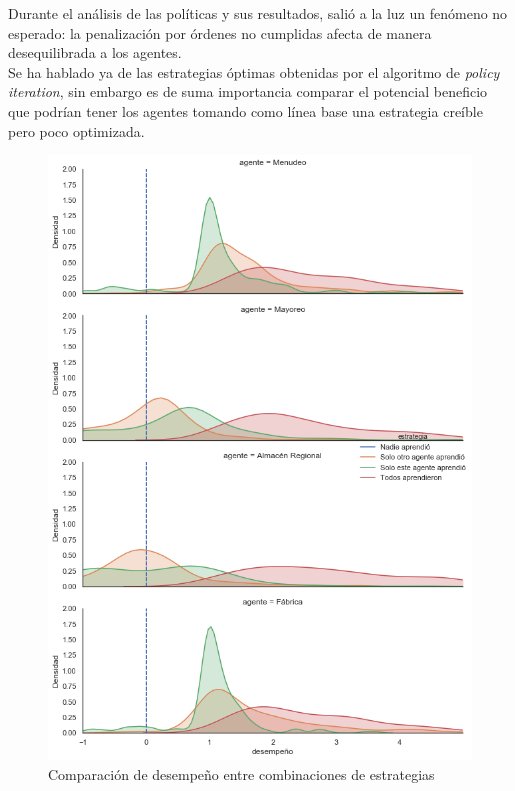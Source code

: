 Durante el an\'alisis de las pol\'iticas y sus resultados, sali\'o a la luz un fen\'omeno no esperado: la penalizaci\'on por \'ordenes no cumplidas afecta de manera desequilibrada a los agentes.\\

Se ha hablado ya de las estrategias \'optimas obtenidas por el algoritmo de \textit{policy iteration}, sin embargo es de suma importancia comparar el potencial beneficio que podr\'ian tener los agentes tomando como l\'inea base una estrategia cre\'ible pero poco optimizada.\\


\begin{figure}[H]
\caption{Comparaci\'on de desempe\~no entre combinaciones de estrategias}
\label{ev_policies_dumb}
\includegraphics[width=14cm]{tesis_tex/figs/evaluating_policies_dumb_to_smart.png}
\centering
\end{figure}


